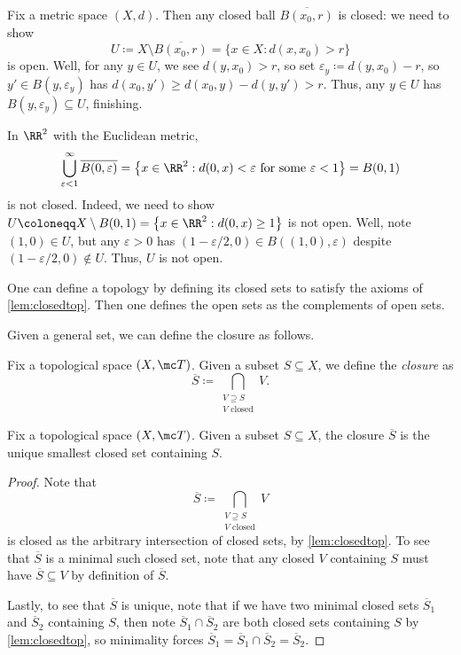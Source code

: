 \documentclass[../notes.tex]{subfiles}
\begin{document}
\begin{example}
	Fix a metric space $(X,d)$. Then any closed ball $\overline{B(x_0,r)}$ is closed: we need to show
	\[U\coloneqq X\setminus\overline{B(x_0,r)}=\{x\in X:d(x,x_0)>r\}\]
	is open. Well, for any $y\in U$, we see $d(y,x_0)>r$, so set $\varepsilon_y\coloneqq d(y,x_0)-r$, so $y'\in B(y,\varepsilon_y)$ has $d(x_0,y')\ge d(x_0,y)-d(y,y')>r$. Thus, any $y\in U$ has $B(y,\varepsilon_y)\subseteq U$, finishing.
\end{example}
\begin{remark}
	In $\RR^2$ with the Euclidean metric,
	\[\bigcup_{\varepsilon<1}^\infty\overline{B(0,\varepsilon)}=\left\{x\in\RR^2:d(0,x)<\varepsilon\text{ for some }\varepsilon<1\right\}=B(0,1)\]
	is not closed. Indeed, we need to show $U\coloneqq X\setminus B(0,1)=\left\{x\in\RR^2:d(0,x)\ge1\right\}$ is not open. Well, note $(1,0)\in U$, but any $\varepsilon>0$ has $(1-\varepsilon/2,0)\in B((1,0),\varepsilon)$ despite $(1-\varepsilon/2,0)\notin U$. Thus, $U$ is not open.
\end{remark}
\begin{remark}
	One can define a topology by defining its closed sets to satisfy the axioms of \autoref{lem:closedtop}. Then one defines the open sets as the complements of open sets.
\end{remark}
Given a general set, we can define the closure as follows.
\begin{definition}[Closure]
	Fix a topological space $(X,\mc T)$. Given a subset $S\subseteq X$, we define the \textit{closure} as
	\[\overline S\coloneqq\bigcap_{\substack{V\supseteq S\\V\text{ closed}}}V.\]
\end{definition}
\begin{lemma}
	Fix a topological space $(X,\mc T)$. Given a subset $S\subseteq X$, the closure $\overline S$ is the unique smallest closed set containing $S$.
\end{lemma}
\begin{proof}
	Note that
	\[\overline S\coloneqq\bigcap_{\substack{V\supseteq S\\V\text{ closed}}}V\]
	is closed as the arbitrary intersection of closed sets, by \autoref{lem:closedtop}. To see that $\overline S$ is a minimal such closed set, note that any closed $V$ containing $S$ must have $\overline S\subseteq V$ by definition of $\overline S$.
	
	Lastly, to see that $\overline S$ is unique, note that if we have two minimal closed sets $\overline S_1$ and $\overline S_2$ containing $S$, then note $\overline S_1\cap\overline S_2$ are both closed sets containing $S$ by \autoref{lem:closedtop}, so minimality forces $\overline S_1=\overline S_1\cap\overline S_2=\overline S_2$.
\end{proof}
\end{document}
